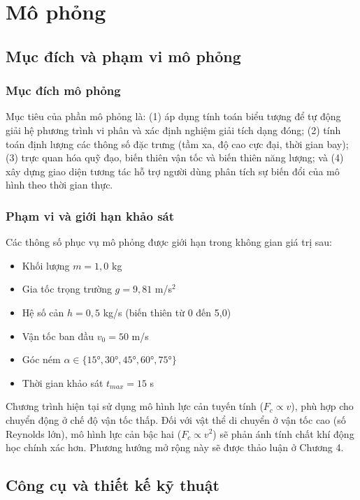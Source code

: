 \section{Mô phỏng}

\subsection{Mục đích và phạm vi mô phỏng}
\subsubsection{Mục đích mô phỏng}
Mục tiêu của phần mô phỏng là: (1) áp dụng tính toán biểu tượng để tự động giải hệ phương trình vi phân và xác định nghiệm giải tích dạng đóng; (2) tính toán định lượng các thông số đặc trưng (tầm xa, độ cao cực đại, thời gian bay); (3) trực quan hóa quỹ đạo, biến thiên vận tốc và biến thiên năng lượng; và (4) xây dựng giao diện tương tác hỗ trợ người dùng phân tích sự biến đổi của mô hình theo thời gian thực.

\subsubsection{Phạm vi và giới hạn khảo sát}
Các thông số phục vụ mô phỏng được giới hạn trong không gian giá trị sau:
\begin{itemize}[nosep]
    \item Khối lượng $m = 1{,}0$ kg
    \item Gia tốc trọng trường $g = 9{,}81$ m/s$^2$
    \item Hệ số cản $h = 0{,}5$ kg/s (biến thiên từ 0 đến 5{,}0)
    \item Vận tốc ban đầu $v_0 = 50$ m/s
    \item Góc ném $\alpha \in \{15°, 30°, 45°, 60°, 75°\}$
    \item Thời gian khảo sát $t_{max} = 15$ s
\end{itemize}

Chương trình hiện tại sử dụng mô hình lực cản tuyến tính ($F_c \propto v$), phù hợp cho chuyển động ở chế độ vận tốc thấp. Đối với vật thể di chuyển ở vận tốc cao (số Reynolds lớn), mô hình lực cản bậc hai ($F_c \propto v^2$) sẽ phản ánh tính chất khí động học chính xác hơn. Phương hướng mở rộng này sẽ được thảo luận ở Chương 4.

\subsection{Công cụ và thiết kế kỹ thuật}
